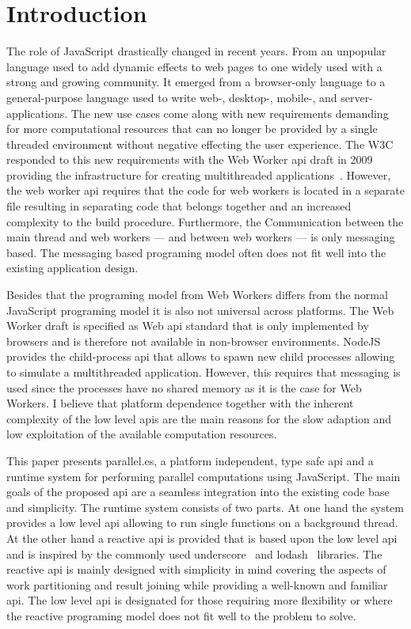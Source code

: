 \section{Introduction}\label{sec:introduction}
The role of JavaScript drastically changed in recent years. From an unpopular language used to add dynamic effects to web pages to one widely used with a strong and growing community. It emerged from a browser-only language to a general-purpose language used to write web-, desktop-, mobile-, and server-applications. The new use cases come along with new requirements demanding for more computational resources that can no longer be provided by a single threaded environment without negative effecting the user experience. The W3C responded to this new requirements with the Web Worker api draft in 2009 providing the infrastructure for creating multithreaded applications~\cite{w3cWebWorker}. However, the web worker api requires that the code for web workers is located in a separate file resulting in separating code that belongs together and an increased complexity to the build procedure. Furthermore, the Communication between the main thread and web workers --- and between web workers --- is only messaging based. The messaging based programing model often does not fit well into the existing application design. 

Besides that the programing model from Web Workers differs from the normal JavaScript programing model it is also not universal across platforms. The Web Worker draft is specified as Web api standard that is only implemented by browsers and is therefore not available in non-browser environments. NodeJS provides the child-process api that allows to spawn new child processes allowing to simulate a multithreaded application. However, this requires that messaging is used since the processes have no shared memory as it is the case for Web Workers. I believe that platform dependence together with the inherent complexity of the low level apis are the main reasons for the slow adaption and low exploitation of the available computation resources.

This paper presents parallel.es, a platform independent, type safe api and a runtime system for performing parallel computations using JavaScript. The main goals of the proposed api are a seamless integration into the existing code base and simplicity. The runtime system consists of two parts. At one hand the system provides a low level api allowing to run single functions on a background thread. At the other hand a reactive api is provided that is based upon the low level api and is inspired by the commonly used underscore~\cite{underscorejs} and lodash~\cite{lodash} libraries. The reactive api is mainly designed with simplicity in mind covering the aspects of work partitioning and result joining while providing a well-known and familiar api. The low level api is designated for those requiring more flexibility or where the reactive programing model does not fit well to the problem to solve. 
		
